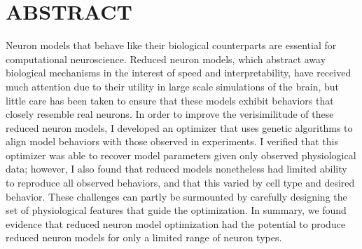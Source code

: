 \chapter*{ABSTRACT}

Neuron models that behave like their biological counterparts are essential for computational neuroscience.
Reduced neuron models, which abstract away biological mechanisms in the interest of speed and interpretability, have received much attention due to their utility in large scale simulations of the brain, but little care has been taken to ensure that these models exhibit behaviors that closely resemble real neurons.
In order to improve the verisimilitude of these reduced neuron models, I developed an optimizer that uses genetic algorithms to align model behaviors with those observed in experiments.
I verified that this optimizer was able to recover model parameters given only observed physiological data; however, I also found that reduced models nonetheless had limited ability to reproduce all observed behaviors, and that this varied by cell type and desired behavior.
These challenges can partly be surmounted by carefully designing the set of physiological features that guide the optimization. In summary, we found evidence that reduced neuron model optimization had the potential to produce reduced neuron models for only a limited range of neuron types.













